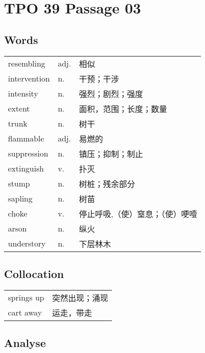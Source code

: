\section{TPO 39 Passage 03}

\subsection{Words}

\begin{tabular}{lll}
    resembling   & adj. & 相似               \\
    intervention & n.   & 干预；干涉            \\
    intensity    & n.   & 强烈；剧烈；强度         \\
    extent       & n.   & 面积，范围；长度；数量      \\
    trunk        & n.   & 树干               \\
    flammable    & adj. & 易燃的              \\
    suppression  & n.   & 镇压；抑制；制止         \\
    extinguish   & v.   & 扑灭               \\
    stump        & n.   & 树桩；残余部分          \\
    sapling      & n.   & 树苗               \\
    choke        & v.   & 停止呼吸,（使）窒息；（使）哽噎 \\
    arson        & n.   & 纵火               \\
    understory   & n.   & 下层林木             \\
\end{tabular}

\subsection{Collocation}

\begin{tabular}{ll}
    springs up & 突然出现；涌现 \\
    cart away  & 运走，带走   \\
\end{tabular}

\newpage

\subsection{Analyse}

